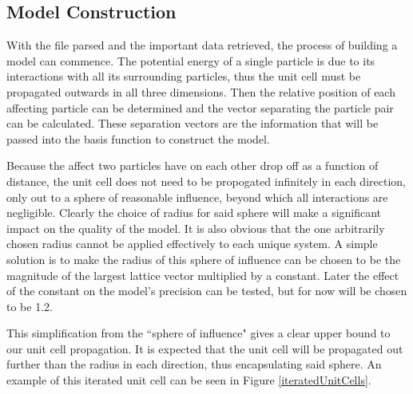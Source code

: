 \subsection{Model Construction}\label{Sect:procedureConstruction}
\par With the file parsed and the important data retrieved, the process of building a model can commence. The potential energy of a single particle is due to its interactions with all its surrounding particles, thus the unit cell must be propagated outwards in all three dimensions. Then the relative position of each affecting particle can be determined and the vector separating the particle pair can be calculated. These separation vectors are the information that will be passed into the basis function to construct the model. 
\par Because the affect two particles have on each other drop off as a function of distance, the unit cell does not need to be propogated infinitely in each direction, only out to a sphere of reasonable influence, beyond which all interactions are negligible. Clearly the choice of radius for said sphere will make a significant impact on the quality of the model. It is also obvious that the one arbitrarily chosen radius cannot be applied effectively to each unique system. A simple solution is to make the radius of this sphere of influence can be chosen to be the magnitude of the largest lattice vector multiplied by a constant. Later the effect of the constant on the model's precision can be tested, but for now will be chosen to be 1.2.
\par This simplification from the ``sphere of influence" gives a clear upper bound to our unit cell propagation. It is expected that the unit cell will be propagated out further than the radius in each direction, thus encapsulating said sphere. An example of this iterated unit cell can be seen in Figure \ref{iteratedUnitCells}. 


